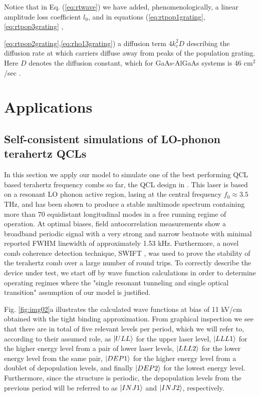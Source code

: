 \documentclass[twocolumn,secnumarabic,amssymb, nobibnotes, aps, prd]{revtex4-1}
\begin{document}
		Notice that in Eq. (\ref{eq:rtwave}) we have added, phenomenologically, a linear amplitude loss coefficient $l_0$, and in equations (\ref{eq:rtpop1grating},\ref{eq:rtpop3grating} ,{\ref{eq:rtpop2grating},\ref{eq:rho13grating}) a diffusion term $4k_c^2D$ describing the diffusion rate at which carriers diffuse away from peaks of the population grating. Here $D$ denotes the diffusion constant, which for GaAs-AlGaAs systems is 46 cm$^2$/sec \cite{wang2009mode,vukovic2016multimode}.
			
			\section{Applications}
			\label{sec:application}
			\subsection{Self-consistent simulations of LO-phonon terahertz QCLs}
			\label{subsec:extension}
			In this section we apply our model to simulate one of the best performing QCL based terahertz frequency combs so far, the QCL design in \cite{burghoff2014terahertz}. This laser is based on a resonant LO phonon active region, lasing at the central frequency  $f_0\approx 3.5$ THz, and  has been shown to produce a stable multimode spectrum containing more than 70 equidistant longitudinal modes in a free running regime of operation. At optimal biases, field autocorrelation measurements show a broadband periodic signal with a very strong and narrow beatnote with minimal reported FWHM linewidth of approximately 1.53 kHz. Furthermore, a novel comb coherence detection technique, SWIFT \cite{burghoff2015evaluating}, was used to prove the stability of the terahertz comb over a large number of round trips. 
			To correctly describe the device under test, we start off by wave function calculations in order to determine operating regimes where the "single resonant tunneling and single optical transition" assumption of our model is justified. 
			
			Fig. \ref{fig:img02}a illustrates the calculated wave functions at bias of 11 kV/cm obtained with the tight binding approximation. From graphical inspection we see that there are in total of five relevant levels per period, which we will refer to, according to their assumed role, as $\Ket{ULL}$ for the upper laser level, $\Ket{LLL1}$ for the higher energy level from a pair of lower laser levels, $\Ket{LLL2}$ for the lower energy level from the same pair, $\Ket{DEP1}$ for the higher energy level from a doublet of depopulation levels, and finally $\Ket{DEP2}$ for the lowest energy level. Furthermore, since the structure is periodic, the depopulation levels from the previous period will be referred to as $\Ket{INJ1}$ and $\Ket{INJ2}$, respectively.
			
}
\end{document}
